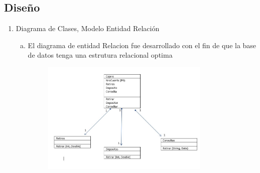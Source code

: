 	
\subsection{Diseño}
\begin{enumerate}[1.]
	\item Diagrama de Clases, Modelo Entidad Relación
	\begin{enumerate}[a)]
	\item  El diagrama de entidad Relacion fue desarrollado con el fin de que la base de datos tenga una estrutura relacional optima
		\begin{figure}[H]
		\begin{center}
		\includegraphics[width=8cm]{./Imagenes/img1}
		\end{center}
		\end{figure}
	\end{enumerate}
\end{enumerate}


